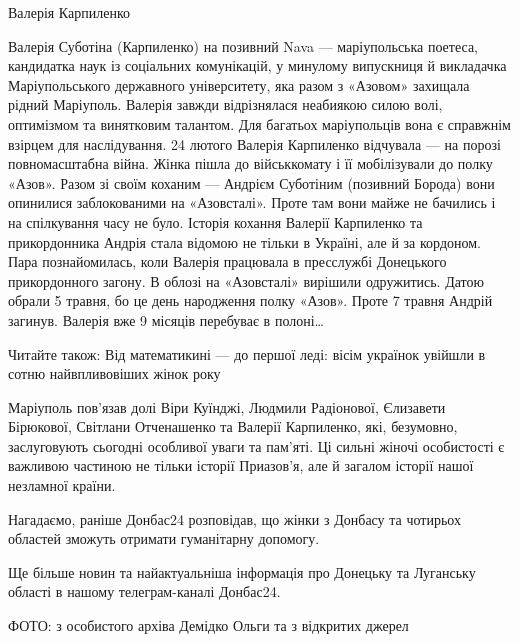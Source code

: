Валерія Карпиленко

Валерія Суботіна (Карпиленко) на позивний Nava — маріупольська поетеса,
кандидатка наук із соціальних комунікацій, у минулому випускниця й викладачка
Маріупольського державного університету, яка разом з «Азовом» захищала рідний
Маріуполь. Валерія завжди відрізнялася неабиякою силою волі, оптимізмом та
винятковим талантом. Для багатьох маріупольців вона є справжнім взірцем для
наслідування. 24 лютого Валерія Карпиленко відчувала — на порозі повномасштабна
війна. Жінка пішла до військкомату і її мобілізували до полку «Азов». Разом зі
своїм коханим — Андрієм Суботіним (позивний Борода) вони опинилися
заблокованими на «Азовсталі». Проте там вони майже не бачились і на спілкування
часу не було. Історія кохання Валерії Карпиленко та прикордонника Андрія стала
відомою не тільки в Україні, але й за кордоном. Пара познайомилась, коли
Валерія працювала в пресслужбі Донецького прикордонного загону. В облозі на
«Азовсталі» вирішили одружитись. Датою обрали 5 травня, бо це день народження
полку «Азов». Проте 7 травня Андрій загинув. Валерія вже 9 місяців перебуває в
полоні…

Читайте також: Від математикині — до першої леді: вісім українок увійшли в
сотню найвпливовіших жінок року

Маріуполь пов'язав долі Віри Куїнджі, Людмили Радіонової, Єлизавети Бірюкової,
Світлани Отченашенко та Валерії Карпиленко, які, безумовно, заслуговують
сьогодні особливої уваги та пам'яті. Ці сильні жіночі особистості є важливою
частиною не тільки історії Приазов'я, але й загалом історії нашої незламної
країни.

Нагадаємо, раніше Донбас24 розповідав, що жінки з Донбасу та чотирьох областей
зможуть отримати гуманітарну допомогу.

Ще більше новин та найактуальніша інформація про Донецьку та Луганську області
в нашому телеграм-каналі Донбас24.

ФОТО: з особистого архіва Демідко Ольги та з відкритих джерел
